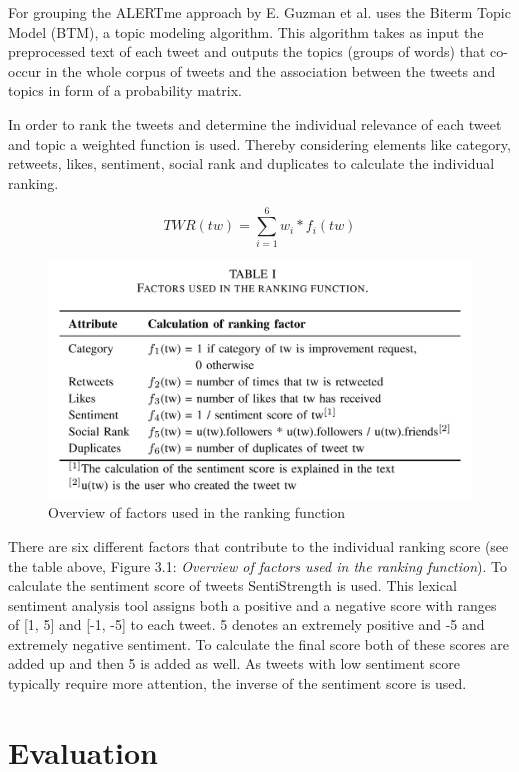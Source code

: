 \documentclass[a4paper,10pt, bibliography=totocnumbered]{scrreprt}
\begin{document}
For grouping the ALERTme approach by E. Guzman et al. \cite{Guzman} uses the Biterm Topic Model (BTM), a topic modeling algorithm. This algorithm takes as input the preprocessed text of each tweet and outputs the topics (groups of words) that co-occur in the whole corpus of tweets and the association between the tweets and topics in form of a probability matrix.

In order to rank the tweets and determine the individual relevance of each tweet and topic a weighted function is used. Thereby considering elements like category, retweets, likes, sentiment, social rank and duplicates to calculate the individual ranking.

 \[ TWR(tw) = \sum_{i=1}^{6} w_i * f_i(tw) \] 

\begin{figure}
\centering
\includegraphics[scale=0.2]{images/Thema_5_RankingFunction.jpeg}
\caption{Overview of factors used in the ranking function}
\label{fig:RankingFunction}
\end{figure}

There are six different factors that contribute to the individual ranking score (see the table above, Figure 3.1: \textit{Overview of factors used in the ranking function}). To calculate the sentiment score of tweets SentiStrength is used. This lexical sentiment analysis tool assigns both a positive and a negative score with ranges of [1, 5] and [-1, -5] to each tweet. 5 denotes an extremely positive and -5 and extremely negative sentiment. To calculate the final score both of these scores are added up and then 5 is added as well. As tweets with low sentiment score typically require more attention, the inverse of the sentiment score is used.

\section{Evaluation}
\end{document}

